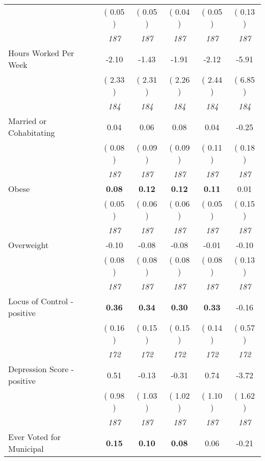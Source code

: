 \begin{tabular}{l c c c c c}
& (     0.05 ) & (     0.05 ) & (     0.04 ) & (     0.05 ) & (     0.13 ) \\
& \textit{ 187 } & \textit{ 187 } & \textit{ 187 } & \textit{ 187 } & \textit{ 187 } \\
Hours Worked Per Week &     -2.10 &     -1.43 &     -1.91 &     -2.12 &     -5.91 \\
& (     2.33 ) & (     2.31 ) & (     2.26 ) & (     2.44 ) & (     6.85 ) \\
& \textit{ 184 } & \textit{ 184 } & \textit{ 184 } & \textit{ 184 } & \textit{ 184 } \\
Married or Cohabitating &      0.04 &      0.06 &      0.08 &      0.04 &     -0.25 \\
& (     0.08 ) & (     0.09 ) & (     0.09 ) & (     0.11 ) & (     0.18 ) \\
& \textit{ 187 } & \textit{ 187 } & \textit{ 187 } & \textit{ 187 } & \textit{ 187 } \\
Obese & \textbf{      0.08 } & \textbf{      0.12 } & \textbf{      0.12 } & \textbf{     0.11} &      0.01 \\
& (     0.05 ) & (     0.06 ) & (     0.06 ) & (     0.05 ) & (     0.15 ) \\
& \textit{ 187 } & \textit{ 187 } & \textit{ 187 } & \textit{ 187 } & \textit{ 187 } \\
Overweight &     -0.10 &     -0.08 &     -0.08 &     -0.01 &     -0.10 \\
& (     0.08 ) & (     0.08 ) & (     0.08 ) & (     0.08 ) & (     0.13 ) \\
& \textit{ 187 } & \textit{ 187 } & \textit{ 187 } & \textit{ 187 } & \textit{ 187 } \\
Locus of Control - positive & \textbf{      0.36 } & \textbf{      0.34 } & \textbf{      0.30 } & \textbf{     0.33} &     -0.16 \\
& (     0.16 ) & (     0.15 ) & (     0.15 ) & (     0.14 ) & (     0.57 ) \\
& \textit{ 172 } & \textit{ 172 } & \textit{ 172 } & \textit{ 172 } & \textit{ 172 } \\
Depression Score - positive &      0.51 &     -0.13 &     -0.31 &      0.74 &     -3.72 \\
& (     0.98 ) & (     1.03 ) & (     1.02 ) & (     1.10 ) & (     1.62 ) \\
& \textit{ 187 } & \textit{ 187 } & \textit{ 187 } & \textit{ 187 } & \textit{ 187 } \\
Ever Voted for Municipal & \textbf{      0.15 } & \textbf{      0.10 } & \textbf{      0.08 } &      0.06 &     -0.21 \\

\end{tabular}
